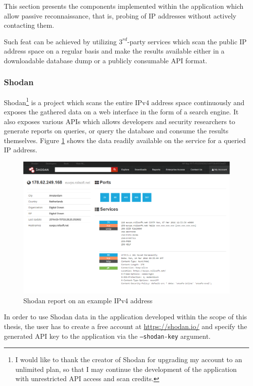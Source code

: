 \documentclass[a4paper,12pt]{article}
\begin{document}
	This section presents the components implemented within the application which allow passive reconnaissance, that is, probing of IP addresses without actively contacting them.
	
	Such feat can be achieved by utilizing $3^{rd}$-party services which scan the public IP address space on a regular basis and make the results available either in a downloadable database dump or a publicly consumable API format.

\subsubsection{Shodan} \label{shodan}
 

	Shodan\footnote{I would like to thank the creator of Shodan for upgrading my account to an unlimited plan, so that I may continue the development of the application with unrestricted API access and scan credits.}\cite{shodan16} is a project which scans the entire IPv4 address space continuously and exposes the gathered data on a web interface in the form of a search engine. It also exposes various APIs which allows developers and security researchers to generate reports on queries, or query the database and consume the results themselves. Figure \ref{shodanscr} shows the data readily available on the service for a queried IP address.

	\begin{figure}[!htbp]
		\centering
		\includegraphics[scale=0.355]{shodan.png}
		\caption{Shodan report on an example IPv4 address}
		\label{shodanscr}
	\end{figure}
	
	In order to use Shodan data in the application developed within the scope of this thesis, the user has to create a free account at \url{https://shodan.io/} and specify the generated API key to the application via the \texttt{--shodan-key} argument.
	
\end{document}
